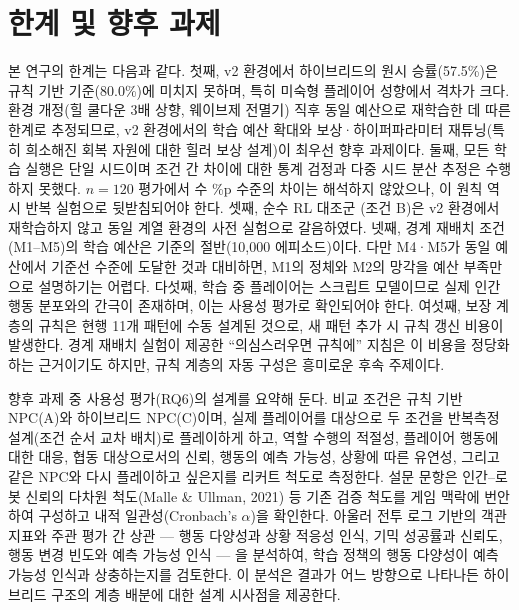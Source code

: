 \documentclass[12pt]{article}      %
\begin{document}
\section{한계 및 향후 과제}

본 연구의 한계는 다음과 같다. 첫째, v2 환경에서 하이브리드의 원시 승률(57.5\%)은
규칙 기반 기준(80.0\%)에 미치지 못하며, 특히 미숙형 플레이어 성향에서 격차가
크다. 환경 개정(힐 쿨다운 3배 상향, 웨이브제 전멸기) 직후 동일 예산으로 재학습한
데 따른 한계로 추정되므로, v2 환경에서의 학습 예산 확대와 보상·하이퍼파라미터
재튜닝(특히 희소해진 회복 자원에 대한 힐러 보상 설계)이 최우선 향후 과제이다.
둘째, 모든 학습 실행은 단일 시드이며 조건 간 차이에 대한 통계 검정과 다중 시드
분산 추정은 수행하지 못했다. $n=120$ 평가에서 수 \%p 수준의 차이는 해석하지
않았으나, 이 원칙 역시 반복 실험으로 뒷받침되어야 한다. 셋째, 순수 RL 대조군
(조건 B)은 v2 환경에서 재학습하지 않고 동일 계열 환경의 사전 실험으로 갈음하였다.
넷째, 경계 재배치 조건(M1--M5)의 학습 예산은 기준의 절반(10{,}000 에피소드)이다.
다만 M4·M5가 동일 예산에서 기준선 수준에 도달한 것과 대비하면, M1의 정체와 M2의
망각을 예산 부족만으로 설명하기는 어렵다. 다섯째, 학습 중 플레이어는 스크립트
모델이므로 실제 인간 행동 분포와의 간극이 존재하며, 이는 사용성 평가로 확인되어야
한다. 여섯째, 보장 계층의 규칙은 현행 11개 패턴에 수동 설계된 것으로, 새 패턴
추가 시 규칙 갱신 비용이 발생한다. 경계 재배치 실험이 제공한 ``의심스러우면
규칙에'' 지침은 이 비용을 정당화하는 근거이기도 하지만, 규칙 계층의 자동 구성은
흥미로운 후속 주제이다.

향후 과제 중 사용성 평가(RQ6)의 설계를 요약해 둔다. 비교 조건은 규칙 기반
NPC(A)와 하이브리드 NPC(C)이며, 실제 플레이어를 대상으로 두 조건을 반복측정
설계(조건 순서 교차 배치)로 플레이하게 하고, 역할 수행의 적절성, 플레이어 행동에
대한 대응, 협동 대상으로서의 신뢰, 행동의 예측 가능성, 상황에 따른 유연성,
그리고 같은 NPC와 다시 플레이하고 싶은지를 리커트 척도로 측정한다. 설문 문항은
인간--로봇 신뢰의 다차원 척도(Malle \& Ullman, 2021) 등 기존 검증 척도를 게임
맥락에 번안하여 구성하고 내적 일관성(Cronbach's $\alpha$)을 확인한다. 아울러
전투 로그 기반의 객관 지표와 주관 평가 간 상관 --- 행동 다양성과 상황 적응성
인식, 기믹 성공률과 신뢰도, 행동 변경 빈도와 예측 가능성 인식 --- 을 분석하여,
학습 정책의 행동 다양성이 예측 가능성 인식과 상충하는지를 검토한다. 이 분석은
결과가 어느 방향으로 나타나든 하이브리드 구조의 계층 배분에 대한 설계 시사점을
제공한다.
\end{document}
